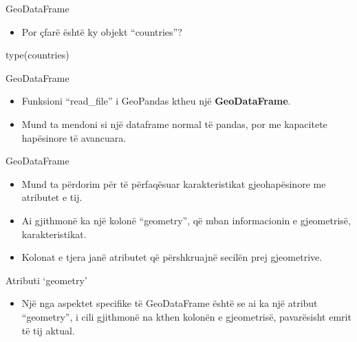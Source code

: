 \documentclass[
  ignorenonframetext,
]{beamer}
\newenvironment{Shaded}{\begin{snugshade}}{\end{snugshade}}
\newcommand{\BuiltInTok}[1]{#1}
\newcommand{\NormalTok}[1]{#1}
\providecommand{\tightlist}{%
  \setlength{\itemsep}{0pt}\setlength{\parskip}{0pt}}
\begin{document}
\begin{frame}[fragile]{GeoDataFrame}
\protect\hypertarget{geodataframe}{}
\begin{itemize}
\tightlist
\item
  Por çfarë është ky objekt ``countries''?
\end{itemize}


\begin{Shaded}
\begin{Highlighting}[]
\BuiltInTok{type}\NormalTok{(countries)}
\end{Highlighting}
\end{Shaded}
\end{frame}

\begin{frame}{GeoDataFrame}
\protect\hypertarget{geodataframe-1}{}
\begin{itemize}
\item
  Funksioni ``read\_file'' i GeoPandas ktheu një \textbf{GeoDataFrame}.
\item
  Mund ta mendoni si një dataframe normal të pandas, por me kapacitete
  hapësinore të avancuara.
\end{itemize}
\end{frame}

\begin{frame}{GeoDataFrame}
\protect\hypertarget{geodataframe-2}{}
\begin{itemize}
\item
  Mund ta përdorim për të përfaqësuar karakteristikat gjeohapësinore me
  atributet e tij.
\item
  Ai gjithmonë ka një kolonë ``geometry'', që mban informacionin e
  gjeometrisë, karakteristikat.
\item
  Kolonat e tjera janë atributet që përshkruajnë secilën prej
  gjeometrive.
\end{itemize}
\end{frame}

\begin{frame}{Atributi `geometry'}
\protect\hypertarget{atributi-geometry}{}
\begin{itemize}
\tightlist
\item
  Një nga aspektet specifike të GeoDataFrame është se ai ka një atribut
  ``geometry'', i cili gjithmonë na kthen kolonën e gjeometrisë,
  pavarësisht emrit të tij aktual.
\end{itemize}
\end{frame}
\end{document}
